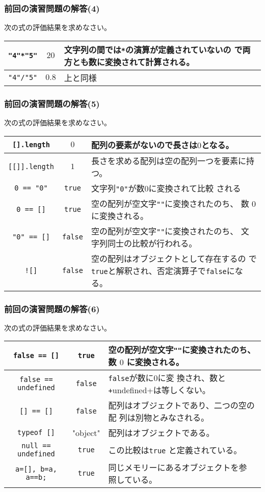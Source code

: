 \begin{frame}[containsverbatim]
\frametitle{前回の演習問題の解答(4)}
次の式の評価結果を求めなさい。
\begin{center}
 \begin{tabular}{|>{\Rule}c|c|m{}|}\hline
  \Verb+"4"*"5"+& $20$& 文字列の間では\Verb+*+の演算が定義されていないの
    で両方とも数に変換されて計算される。\\ \hline
  \Verb+"4"/"5"+& $0.8$& 上と同様\\ \hline
 \end{tabular}
\end{center}
\end{frame}
\begin{frame}[containsverbatim]
\frametitle{前回の演習問題の解答(5)}
次の式の評価結果を求めなさい。
\begin{center}
 \begin{tabular}{|>{\Rule}c|c|m{}|}\hline
  \Verb+[].length+& $0$& 配列の要素がないので長さは$0$となる。\\ \hline
  \Verb+[[]].length+&$1$ & 長さを求める配列は空の配列一つを要素に持つ。\\ \hline
  \Verb+0 == "0"+& \Verb+true+& 文字列\Verb+"0"+が数$0$に変換されて比較
    される\\ \hline
  \Verb+0 == []+& \Verb+true+& 空の配列が空文字\texttt{""}に変換されたのち、
    数 $0$ に変換される。\\ \hline
  \Verb+"0" == []+& \Verb+false+& 空の配列が空文字\texttt{""}に変換されたのち、
    文字列同士の比較が行われる。\\ \hline
  \Verb+![]+& \Verb+false+& 空の配列はオブジェクトとして存在するの
          で\texttt{true}と解釈され、否定演算子で\texttt{false}になる。
          \\ \hline
 \end{tabular}
\end{center}
\end{frame}
\begin{frame}[containsverbatim]
\frametitle{前回の演習問題の解答(6)}
次の式の評価結果を求めなさい。
\begin{center}
 \begin{tabular}{|>{\Rule}c|c|m{}|}\hline
  \Verb+false == []+& \Verb+true+& 空の配列が空文字\texttt{""}に変換されたのち、
    数 $0$ に変換される。\\ \hline
  \Verb+false == undefined+& \texttt{false}&\texttt{false}が数に$0$に変
          換され、数と\texttt+undefined+は等しくない。\\ \hline
  \Verb+[] == []+& \Verb+false+& 配列はオブジェクトであり、二つの空の配
    列は別物とみなされる。\\ \hline
  \Verb+typeof []+& "object"& 配列はオブジェクトである。\\ \hline
  \Verb+null == undefined+& \Verb+true+ & この比較は\texttt{true}
  と定義されている。\\ \hline
  \Verb+a=[], b=a, a==b;+&\Verb+true+&同じメモリーにあるオブジェクトを参
    照している。\\ \hline
 \end{tabular}
\end{center}
\end{frame}
